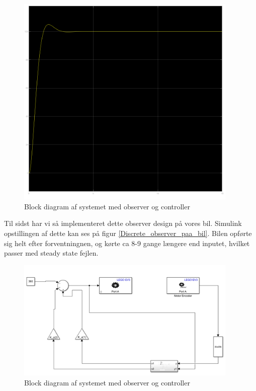 \begin{figure}[H]
	\centering
	\includegraphics[width = 300pt]{Img/Continuos_cl_simulering.png}
	\caption{Block diagram af systemet med observer og controller}
	\label{Continuos_cl_simulering}
\end{figure}

Til sidst har vi så implementeret dette observer design på vores bil. Simulink opstillingen af dette kan ses på figur \autoref{Discrete_observer_paa_bil}. Bilen opførte sig helt efter forventningnen, og kørte ca 8-9 gange længere end inputet, hvilket passer med steady state fejlen. 

\begin{figure}[H]
	\centering
	\includegraphics[width = 300pt]{Img/Discrete_observer_paa_bil.png}
	\caption{Block diagram af systemet med observer og controller}
	\label{Discrete_observer_paa_bil}
\end{figure}
